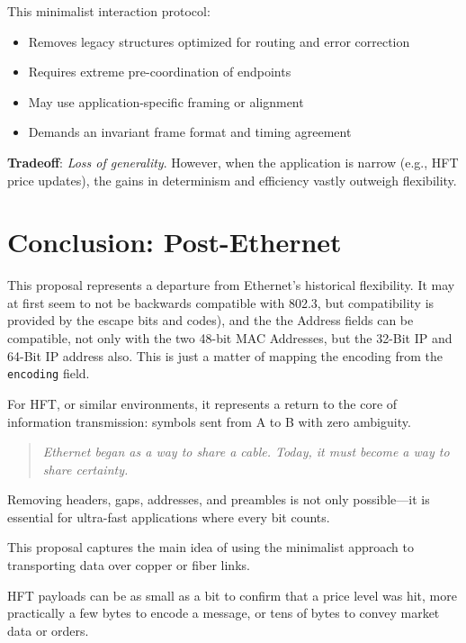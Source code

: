 \documentclass[HFT-main.tex]{subfiles} %
\begin{document}
This minimalist interaction protocol:
\begin{itemize}
  \item Removes legacy structures optimized for routing and error correction
  \item Requires extreme pre-coordination of endpoints
  \item May use application-specific framing or alignment
  \item Demands an invariant frame format and timing agreement
\end{itemize}

\textbf{Tradeoff}: \emph{Loss of generality}. However, when the application is narrow (e.g., HFT price updates), the gains in determinism and efficiency vastly outweigh flexibility.

\section{Conclusion: Post-Ethernet}

This proposal represents a departure from Ethernet’s historical flexibility. It may at first seem to not be backwards compatible with 802.3, but compatibility is provided by the escape bits and codes), and the the Address fields can be compatible, not only with the two 48-bit MAC Addresses, but the 32-Bit IP and 64-Bit IP address also. This is just a matter of mapping the encoding from the \texttt{encoding} field.

For HFT, or similar environments, it represents a return to the core of information transmission: symbols sent from A to B with zero ambiguity.

\begin{quote}
\textit{Ethernet began as a way to share a cable. Today, it must become a way to share certainty.}
\end{quote}

Removing headers, gaps, addresses, and preambles is not only possible—it is essential for ultra-fast applications where every bit counts.

This proposal captures the main idea of using the minimalist approach to transporting data over copper or fiber links. %

HFT payloads can be as small as a bit to confirm that a price level was hit, more practically a few bytes to encode a message, or tens of bytes to convey market data or orders.


%
\end{document}

